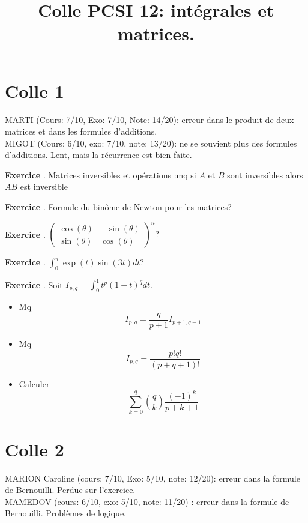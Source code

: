 \documentclass[10pt,a4paper]{article}
\title{Colle PCSI 12: intégrales et matrices.}
\newcounter{question}
\newcounter{exo}
\newenvironment{exo}{\vspace{0.5cm}\setcounter{question}{0}\addtocounter{exo}{1} \noindent \textbf{Exercice \theexo}. \normalsize }{\par}
\begin{document}
	\maketitle
	
	
	\section*{Colle 1}
	\setcounter{exo}{0}
	MARTI (Cours: 7/10, Exo: 7/10, Note: 14/20): erreur dans le produit de deux matrices et dans les formules d'additions. \\
	MIGOT (Cours: 6/10, exo: 7/10, note: 13/20): ne se souvient plus des formules d'additions. Lent, mais la récurrence est bien faite.\\
	
	\begin{exo}
		Matrices inversibles et opérations :mq si $A$ et $B$ sont inversibles alors $AB$ est inversible
	\end{exo}
	
	\begin{exo}
		Formule du binôme de Newton pour les matrices?
	\end{exo}
	
	\begin{exo}
		$\begin{pmatrix}
			\cos(\theta) & -\sin(\theta) \\ 
			\sin(\theta) & \cos(\theta)
		\end{pmatrix}^n ?$
	\end{exo}
	
	\begin{exo}
		$\int_{0}^{\pi} \exp(t) \sin(3t) dt$?
	\end{exo}	
	
	\begin{exo}
		Soit $I_{p, q} = \int_{0}^{1} t^p (1 - t)^q dt$. 
		\begin{itemize}
			\item Mq $$I_{p, q} = \frac{q}{p+1} I_{p+1, q-1}$$
			\item Mq $$I_{p, q} = \frac{p! q!}{(p+q+1)!}$$
			\item Calculer $$\sum_{k=0}^{q} \binom{q}{k} \frac{(-1)^k}{p+k+1}$$
		\end{itemize}
	\end{exo}
	
	\section*{Colle 2}
	\setcounter{exo}{0}
	MARION Caroline (cours: 7/10, Exo: 5/10, note: 12/20): erreur dans la formule de Bernouilli. Perdue sur l'exercice.\\
	MAMEDOV (cours: 6/10, exo: 5/10, note: 11/20) : erreur dans la formule de Bernouilli. Problèmes de logique. \\
	
\end{document}
